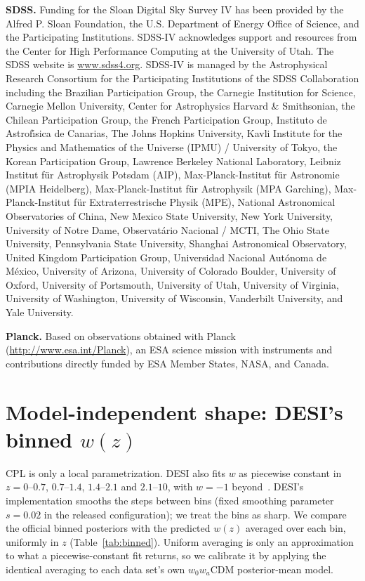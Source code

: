 \documentclass[11pt]{article}
\theoremstyle{definition}
\theoremstyle{remark}
\begin{document}
\textbf{SDSS.} Funding for the Sloan Digital Sky Survey IV has been provided by the Alfred P. Sloan Foundation, the U.S. Department of Energy Office of Science, and the Participating Institutions. SDSS-IV acknowledges support and resources from the Center for High Performance Computing at the University of Utah. The SDSS website is \url{www.sdss4.org}. SDSS-IV is managed by the Astrophysical Research Consortium for the Participating Institutions of the SDSS Collaboration including the Brazilian Participation Group, the Carnegie Institution for Science, Carnegie Mellon University, Center for Astrophysics \textbar{} Harvard \& Smithsonian, the Chilean Participation Group, the French Participation Group, Instituto de Astrof\'{\i}sica de Canarias, The Johns Hopkins University, Kavli Institute for the Physics and Mathematics of the Universe (IPMU) / University of Tokyo, the Korean Participation Group, Lawrence Berkeley National Laboratory, Leibniz Institut f\"ur Astrophysik Potsdam (AIP), Max-Planck-Institut f\"ur Astronomie (MPIA Heidelberg), Max-Planck-Institut f\"ur Astrophysik (MPA Garching), Max-Planck-Institut f\"ur Extraterrestrische Physik (MPE), National Astronomical Observatories of China, New Mexico State University, New York University, University of Notre Dame, Observat\'ario Nacional / MCTI, The Ohio State University, Pennsylvania State University, Shanghai Astronomical Observatory, United Kingdom Participation Group, Universidad Nacional Aut\'onoma de M\'exico, University of Arizona, University of Colorado Boulder, University of Oxford, University of Portsmouth, University of Utah, University of Virginia, University of Washington, University of Wisconsin, Vanderbilt University, and Yale University.

\textbf{Planck.} Based on observations obtained with Planck (\url{http://www.esa.int/Planck}), an ESA science mission with instruments and contributions directly funded by ESA Member States, NASA, and Canada.

\appendix

\section{Model-independent shape: DESI's binned $w(z)$}\label{sec:binned}

CPL is only a local parametrization. DESI also fits $w$ as piecewise constant in $z = 0$--$0.7$, $0.7$--$1.4$, $1.4$--$2.1$ and $2.1$--$10$, with $w = -1$ beyond~\cite{DESIchains}. DESI's implementation smooths the steps between bins (fixed smoothing parameter $s = 0.02$ in the released configuration); we treat the bins as sharp. We compare the official binned posteriors with the predicted $w(z)$ averaged over each bin, uniformly in $z$ (Table~\ref{tab:binned}). Uniform averaging is only an approximation to what a piecewise-constant fit returns, so we calibrate it by applying the identical averaging to each data set's own $w_0w_a$CDM posterior-mean model.
\end{document}
